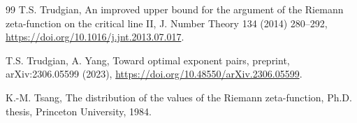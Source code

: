 \documentclass[preprint,12pt]{elsarticle}
\numberwithin{equation}{section}
\theoremstyle{plain}
\theoremstyle{definition}
\theoremstyle{remark}
\begin{document}
\begin{thebibliography}{99}
T.S. Trudgian, An improved upper bound for the argument of the Riemann zeta-function on the critical line II, J. Number Theory 134 (2014) 280--292, \href{https://doi.org/10.1016/j.jnt.2013.07.017}{https://doi.org/10.1016/j.jnt.2013.07.017}.

T.S. Trudgian, A. Yang, Toward optimal exponent pairs, preprint, arXiv:2306.05599 (2023), \href{https://doi.org/10.48550/arXiv.2306.05599}{https://doi.org/10.48550/arXiv.2306.05599}.

K.-M. Tsang, The distribution of the values of the Riemann zeta-function, Ph.D. thesis, Princeton University, 1984.

\end{thebibliography}
\end{document}
